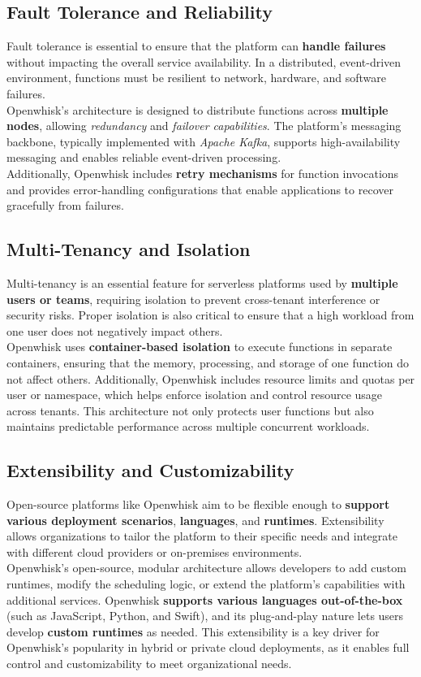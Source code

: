 \subsection{Fault Tolerance and Reliability}
Fault tolerance is essential to ensure that the platform can \textbf{handle failures} without impacting the overall service availability. In a distributed, event-driven environment, functions must be resilient to network, hardware, and software failures.\vspace{14pt}\\
Openwhisk’s architecture is designed to distribute functions across \textbf{multiple nodes}, allowing \textit{redundancy} and \textit{failover capabilities}. The platform’s messaging backbone, typically implemented with \textit{Apache Kafka}, supports high-availability messaging and enables reliable event-driven processing.\\
Additionally, Openwhisk includes \textbf{retry mechanisms} for function invocations and provides error-handling configurations that enable applications to recover gracefully from failures.
\subsection{Multi-Tenancy and Isolation}
Multi-tenancy is an essential feature for serverless platforms used by \textbf{multiple users or teams}, requiring isolation to prevent cross-tenant interference or security risks. Proper isolation is also critical to ensure that a high workload from one user does not negatively impact others.\vspace{14pt}\\
Openwhisk uses \textbf{container-based isolation} to execute functions in separate containers, ensuring that the memory, processing, and storage of one function do not affect others. Additionally, Openwhisk includes resource limits and quotas per user or namespace, which helps enforce isolation and control resource usage across tenants. This architecture not only protects user functions but also maintains predictable performance across multiple concurrent workloads.
\subsection{Extensibility and Customizability}
Open-source platforms like Openwhisk aim to be flexible enough to \textbf{support various deployment scenarios}, \textbf{languages}, and \textbf{runtimes}. Extensibility allows organizations to tailor the platform to their specific needs and integrate with different cloud providers or on-premises environments.\vspace{14pt}\\
Openwhisk’s open-source, modular architecture allows developers to add custom runtimes, modify the scheduling logic, or extend the platform’s capabilities with additional services. Openwhisk \textbf{supports various languages out-of-the-box} (such as JavaScript, Python, and Swift), and its plug-and-play nature lets users develop \textbf{custom runtimes} as needed. This extensibility is a key driver for Openwhisk’s popularity in hybrid or private cloud deployments, as it enables full control and customizability to meet organizational needs.
